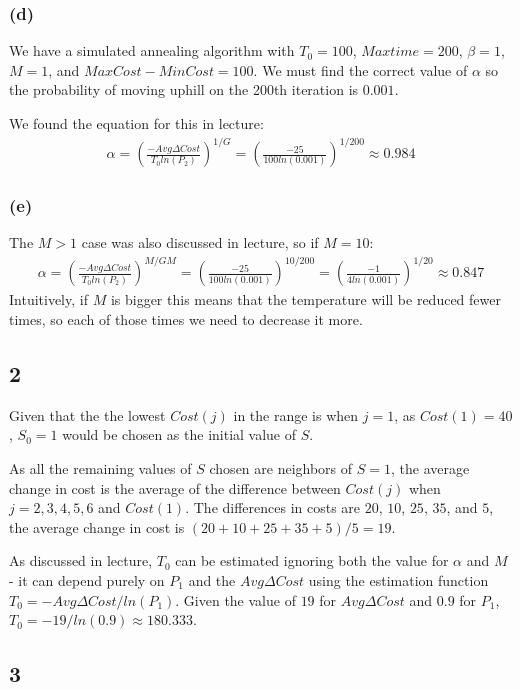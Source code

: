 \documentclass[12pt]{article}
\begin{document}
\subsubsection{(d)}
We have a simulated annealing algorithm with $T_0 = 100$, $Maxtime = 200$, $\beta=1$, $M=1$, and $MaxCost - MinCost = 100$.  We must find the correct value of $\alpha$ so the probability of moving uphill on the 200th iteration is $0.001$.

We found the equation for this in lecture:
\begin{align*}
\alpha  = \left( \frac{-Avg\Delta Cost}{T_0 ln(P_2)} \right)^{1/G}
= \left( \frac{-25}{100 ln(0.001)} \right)^{1/200}
\approx 0.984
\end{align*}

\subsubsection{(e)}
The $M>1$ case was also discussed in lecture, so if $M=10$:
\begin{align*}
\alpha  = \left( \frac{-Avg\Delta Cost}{T_0 ln(P_2)} \right)^{M/GM}
= \left( \frac{-25}{100 ln(0.001)} \right)^{10/200}
= \left( \frac{-1}{4 ln(0.001)} \right)^{1/20}
\approx 0.847
\end{align*}
Intuitively, if $M$ is bigger this means that the temperature will be reduced fewer times, so each of those times we need to decrease it more.

\subsection{2}
Given that the the lowest $Cost(j)$ in the range is when $j = 1$, as $Cost(1) = 40$, $S_0 = 1$ would be chosen as the initial value of $S$. 

As all the remaining values of $S$ chosen are neighbors of $S = 1$, the average change in cost is the average of the difference between $Cost(j)$ when $j = 2,3,4,5,6$ and $Cost(1)$. The differences in costs are $20$, $10$, $25$, $35$, and $5$, the average change in cost is $(20 + 10 + 25 + 35 + 5) / 5 = 19$. 

As discussed in lecture, $T_0$ can be estimated ignoring both the value for $\alpha$ and $M$ - it can depend purely on $P_1$ and the $Avg\Delta Cost$ using the estimation function $T_0 = -Avg\Delta Cost / ln(P_1)$. Given the value of $19$ for $Avg\Delta Cost$ and $0.9$ for $P_1$, $T_0 = -19/ln(0.9) \approx 180.333$. 

\subsection{3}
\end{document}

